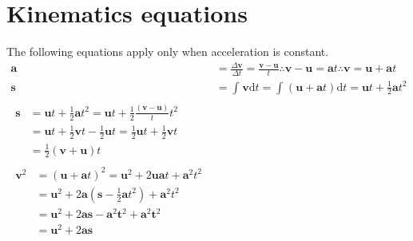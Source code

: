\documentclass[Physics.tex]{subfiles}
\begin{document}
\section{Kinematics equations}
The following equations apply only when acceleration is constant.
\begin{align}
\mathbf{a} &= \frac{\Delta\mathbf{v}}{\Delta t} = \frac{\mathbf{v} - \mathbf{u}}{t} \mathrel{\therefore} \mathbf{v} - \mathbf{u} = \mathbf{a}t \mathrel{\therefore} \mathbf{v} = \mathbf{u} + \mathbf{a}t\\
\mathbf{s} &= \int_{}^{}{\mathbf{v}\mathrm{d}t} = \int_{}^{}{(\mathbf{u} + \mathbf{a}t)\mathrm{d}t} = \mathbf{u}t + \frac{1}{2}\mathbf{a}t^{2}\\
\begin{split}\mathbf{s} &= \mathbf{u}t + \frac{1}{2}\mathbf{a}t^{2} = \mathbf{u}t + \frac{1}{2}\frac{( \mathbf{v} - \mathbf{u})}{t}t^{2}%
\\ &= \mathbf{u}t + \frac{1}{2}\mathbf{v}t - \frac{1}{2}\mathbf{u}t = \frac{1}{2}\mathbf{u}t + \frac{1}{2}\mathbf{v}t\\&= \frac{1}{2}(\mathbf{v} + \mathbf{u})t\end{split}\\
\begin{split}\mathbf{v}^{2} &= ( \mathbf{u} + \mathbf{a}t )^{2} = \mathbf{u}^{2} + 2\mathbf{ua}t + \mathbf{a}^{2}t^{2}\\&= \mathbf{u}^{2} + 2\mathbf{a}( \mathbf{s} - \frac{1}{2}\mathbf{a}t^{2} ) + \mathbf{a}^{2}t^{2}\\&= \mathbf{u}^{2} + 2\mathbf{as} - \mathbf{a}^{2}\mathbf{t}^{2} + \mathbf{a}^{2}\mathbf{t}^{2}\\&= \mathbf{u}^{2} + 2\mathbf{as}\end{split}
\end{align}
\end{document}
